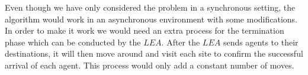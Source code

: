 Even though we have only considered the problem in a synchronous setting,  the algorithm would work in an asynchronous environment with some modifications. In order to make it work we would need an extra process for the termination phase which can be conducted by the $LEA$. After the $LEA$ sends agents to their destinations, it will then move around and visit each site to confirm the successful arrival of each agent. This process would only add a constant number of moves.



